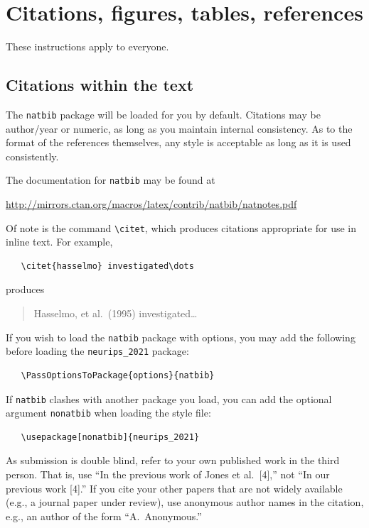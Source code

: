 \documentclass{article}
\begin{document}
\section{Citations, figures, tables, references}
\label{others}

These instructions apply to everyone.

\subsection{Citations within the text}

The \verb+natbib+ package will be loaded for you by default.  Citations may be
author/year or numeric, as long as you maintain internal consistency.  As to the
format of the references themselves, any style is acceptable as long as it is
used consistently.

The documentation for \verb+natbib+ may be found at
\begin{center}
  \url{http://mirrors.ctan.org/macros/latex/contrib/natbib/natnotes.pdf}
\end{center}
Of note is the command \verb+\citet+, which produces citations appropriate for
use in inline text.  For example,
\begin{verbatim}
   \citet{hasselmo} investigated\dots
\end{verbatim}
produces
\begin{quote}
  Hasselmo, et al.\ (1995) investigated\dots
\end{quote}

If you wish to load the \verb+natbib+ package with options, you may add the
following before loading the \verb+neurips_2021+ package:
\begin{verbatim}
   \PassOptionsToPackage{options}{natbib}
\end{verbatim}

If \verb+natbib+ clashes with another package you load, you can add the optional
argument \verb+nonatbib+ when loading the style file:
\begin{verbatim}
   \usepackage[nonatbib]{neurips_2021}
\end{verbatim}

As submission is double blind, refer to your own published work in the third
person. That is, use ``In the previous work of Jones et al.\ [4],'' not ``In our
previous work [4].'' If you cite your other papers that are not widely available
(e.g., a journal paper under review), use anonymous author names in the
citation, e.g., an author of the form ``A.\ Anonymous.''
\end{document}
